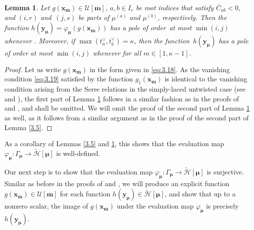 \documentclass[pdftex]{sigma}
\numberwithin{equation}{section}
\newtheorem{Lemma}[Theorem]{Lemma}
\begin{document}
\begin{Lemma}\label{3.6}
Let $g(\mathbf{x}_{\overline{\mathbf{m}}})\in\mathcal{U}[\overline{\mathbf{m}}]$, $a,b\in I_r$ be root indices that satisfy $\overline{C}_{ab}<0$, and $(i,r)$ and~${(j,s)}$ be parts of $\mu^{(a)}$ and $\mu^{(b)}$, respectively. Then the function $h(\mathbf{y}_{\bm{\mu}})=\varphi_{\bm{\mu}}(g(\mathbf{x}_{\overline{\mathbf{m}}}))$ has a pole of order~at most $\min(i,j)$ whenever . Moreover, if $\max(t_a^{\vee},t_b^{\vee})=\kappa$, then the function~$h(\mathbf{y}_{\bm{\mu}})$ has a pole of order at most $\min(i,j)$ whenever  for all $m\in[1,\kappa-1]$.
\end{Lemma}

\begin{proof}
Let us write $g(\mathbf{x}_{\overline{\mathbf{m}}})$ in the form given in \eqref{eq:3.18}. As the vanishing condition \eqref{eq:3.19} satisfied by the function $g_1(\mathbf{x}_{\overline{\mathbf{m}}})$ is identical to the vanishing condition arising from the Serre relations in the simply-laced untwisted case (see \cite[equation~(3.15)]{AKS06} and \cite[equation~(4.4)]{AK07}), the first part of Lemma \ref{3.6} follows in a similar fashion as in the proofs of \cite[Lemma 3.8]{AKS06} and \cite[Lemma A.2]{AK07}, and shall be omitted. We will omit the proof of the second part of Lemma \ref{3.6} as well, as it follows from a similar argument as in the proof of the second part of Lemma \ref{3.5}.
\end{proof}

As a corollary of Lemmas \ref{3.5} and \ref{3.6}, this shows that the evaluation map $\varphi_{\bm{\mu}}\colon\Gamma_{\bm{\mu}} \to\tilde{\mathcal{H}}[\bm{\mu}]$ is well-defined.

Our next step is to show that the evaluation map $\varphi_{\bm{\mu}}\colon\Gamma_{\bm{\mu}} \to\tilde{\mathcal{H}}[\bm{\mu}]$ is surjective. Similar as before in the proofs of \cite[Lemma 3.16]{AKS06} and \cite[Theorem A.4]{AK07}, we will produce an explicit function $g(\mathbf{x}_{\overline{ \mathbf{m}}})\in\mathcal{U}[\overline{\mathbf{m}}]$ for each function $h(\mathbf{y}_{\bm{\mu}})\in \tilde{\mathcal{H}}[\bm{\mu}]$, and show that up to a nonzero scalar, the image of $g(\mathbf{x}_{\overline{\mathbf{m}}})$ under the evaluation map $\varphi_{\bm{\mu}}$ is precisely $h(\mathbf{y}_{\bm{\mu}})$.
\end{document}
